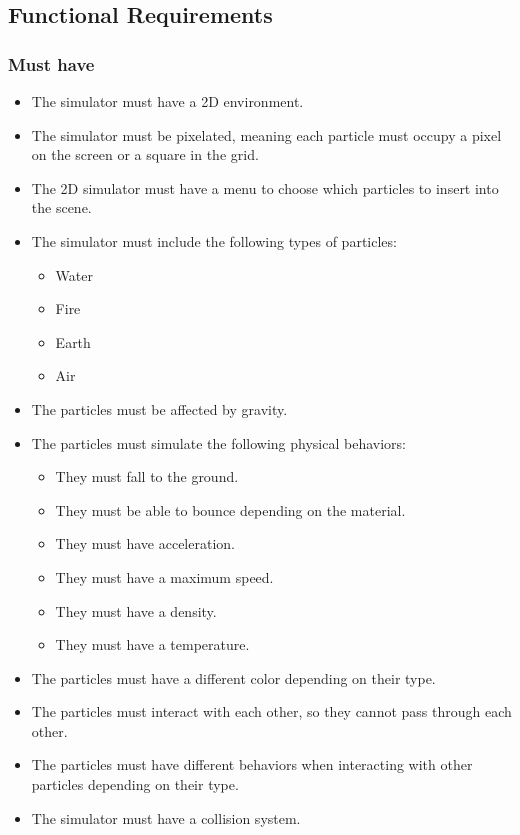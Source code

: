 \documentclass{article}
\begin{document}
\subsection{Functional Requirements}

\subsubsection{Must have}

\begin{itemize}
    \item The simulator must have a 2D environment.
    \item The simulator must be pixelated, meaning each particle must occupy a pixel on the screen or a square in the grid.
    \item The 2D simulator must have a menu to choose which particles to insert into the scene.
    \item The simulator must include the following types of particles:
    \begin{itemize}
        \item Water
        \item Fire
        \item Earth
        \item Air
    \end{itemize}
    \item The particles must be affected by gravity.
    \item The particles must simulate the following physical behaviors:
    \begin{itemize}
        \item They must fall to the ground.
        \item They must be able to bounce depending on the material.
        \item They must have acceleration.
        \item They must have a maximum speed.
        \item They must have a density.
        \item They must have a temperature.
    \end{itemize}
    \item The particles must have a different color depending on their type.
    \item The particles must interact with each other, so they cannot pass through each other.
    \item The particles must have different behaviors when interacting with other particles depending on their type.
    \item The simulator must have a collision system.
\end{itemize}
\end{document}
